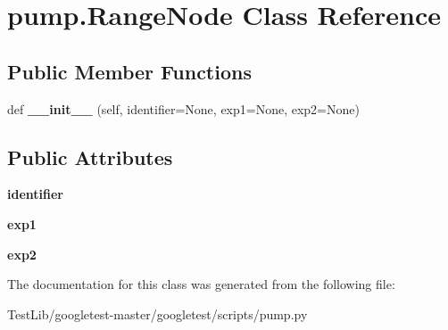 \hypertarget{classpump_1_1RangeNode}{}\section{pump.\+Range\+Node Class Reference}
\label{classpump_1_1RangeNode}
\subsection*{Public Member Functions}
\begin{DoxyCompactItemize}
\item 
\mbox{\label{classpump_1_1RangeNode_a58e85945a5a6e2f899e8243422c871e3}} 
def {\bfseries \+\_\+\+\_\+init\+\_\+\+\_\+} (self, identifier=None, exp1=None, exp2=None)
\end{DoxyCompactItemize}
\subsection*{Public Attributes}
\begin{DoxyCompactItemize}
\item 
\mbox{\label{classpump_1_1RangeNode_ae75b9f31ba8c3bd048cf09b22035efa0}} 
{\bfseries identifier}
\item 
\mbox{\label{classpump_1_1RangeNode_acbb59f8c5e23d23563ca03f21574ce63}} 
{\bfseries exp1}
\item 
\mbox{\label{classpump_1_1RangeNode_afe153ee472b121652a51c62c1522cc13}} 
{\bfseries exp2}
\end{DoxyCompactItemize}


The documentation for this class was generated from the following file\+:\begin{DoxyCompactItemize}
\item 
Test\+Lib/googletest-\/master/googletest/scripts/pump.\+py\end{DoxyCompactItemize}
